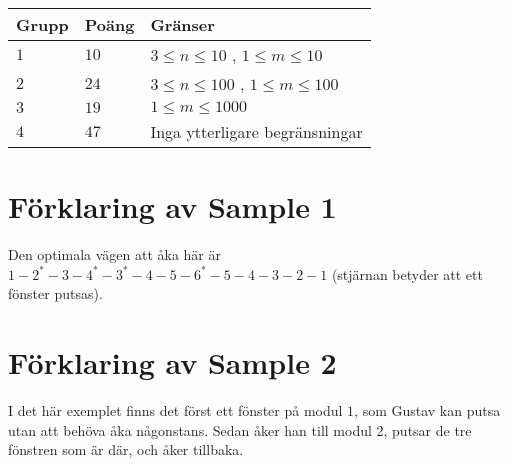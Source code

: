 \noindent
\begin{tabular}{| l | l | p{12cm} |}
  \hline
  \textbf{Grupp} & \textbf{Poäng} & \textbf{Gränser} \\ \hline
  $1$    & $10$      & $3 \le n \le 10$ , $1 \le m \le 10$ \\ \hline
  $2$    & $24$      & $3 \le n \le 100$ , $1 \le m \le 100$ \\ \hline
  $3$    & $19$      & $1 \le m \le 1000$  \\ \hline
  $4$    & $47$      & Inga ytterligare begränsningar \\ \hline
\end{tabular}

\section*{Förklaring av Sample 1}
Den optimala vägen att åka här är $1-2^*-3-4^*-3^*-4-5-6^*-5-4-3-2-1$ (stjärnan betyder att ett fönster putsas).
\section*{Förklaring av Sample 2}
I det här exemplet finns det först ett fönster på modul $1$, som Gustav kan putsa utan att behöva åka någonstans. Sedan åker han till modul 2,
putsar de tre fönstren som är där, och åker tillbaka.
